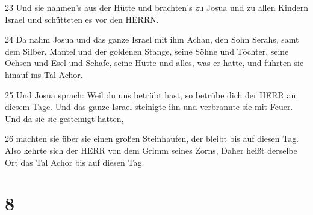 \par 23 Und sie nahmen's aus der Hütte und brachten's zu Josua und zu allen Kindern Israel und schütteten es vor den HERRN.
\par 24 Da nahm Josua und das ganze Israel mit ihm Achan, den Sohn Serahs, samt dem Silber, Mantel und der goldenen Stange, seine Söhne und Töchter, seine Ochsen und Esel und Schafe, seine Hütte und alles, was er hatte, und führten sie hinauf ins Tal Achor.
\par 25 Und Josua sprach: Weil du uns betrübt hast, so betrübe dich der HERR an diesem Tage. Und das ganze Israel steinigte ihn und verbrannte sie mit Feuer. Und da sie sie gesteinigt hatten,
\par 26 machten sie über sie einen großen Steinhaufen, der bleibt bis auf diesen Tag. Also kehrte sich der HERR von dem Grimm seines Zorns, Daher heißt derselbe Ort das Tal Achor bis auf diesen Tag.

\chapter{8}

